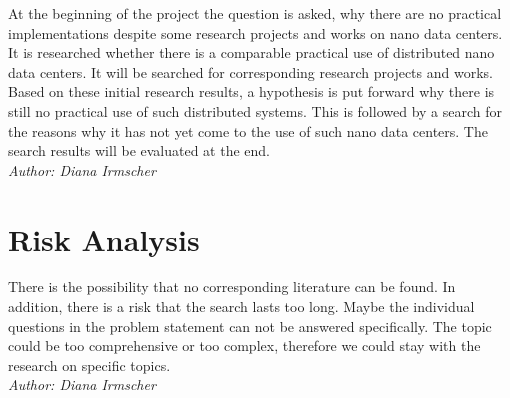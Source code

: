 \documentclass[sigchi-a, authorversion]{acmart}
\begin{document}
At the beginning of the project the question is asked, why there are no practical implementations despite some research projects and works on nano data centers.
It is researched whether there is a comparable practical use of distributed nano data centers. It will be searched for corresponding research projects and works. Based on these initial research results, a hypothesis is put forward why there is still no practical use of such distributed systems. This is followed by a search for the reasons why it has not yet come to the use of such nano data centers. The search results will be evaluated at the end.\\
\textit{Author: Diana Irmscher} \\

\section{Risk Analysis} %
There is the possibility that no corresponding literature can be found. In addition, there is a risk that the search lasts too long. Maybe the individual questions in the problem statement can not be answered specifically. The topic could be too comprehensive or too complex, therefore we could stay with the research on specific topics.\\
\textit{Author: Diana Irmscher} \\



\end{document}
